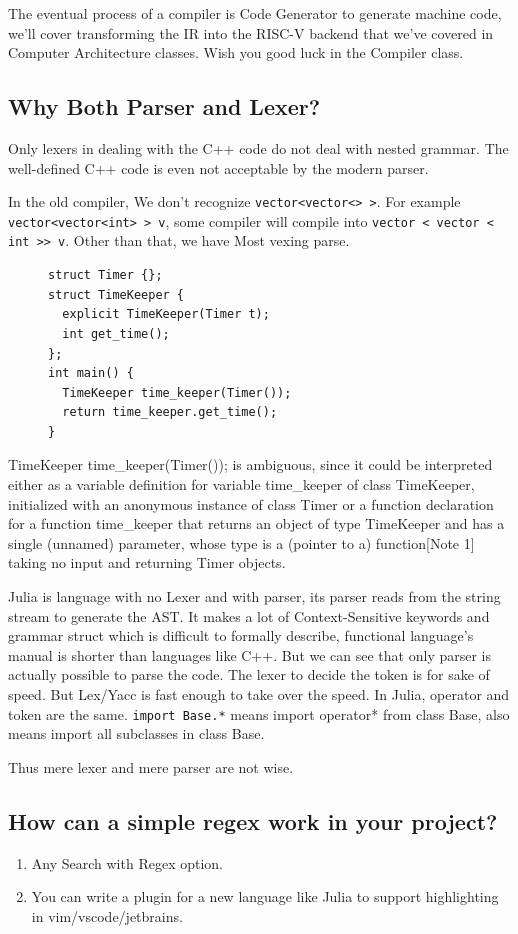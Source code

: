 \documentclass[a4paper]{exam}
\newcommand{\code}[1]{\texttt{#1}}
\begin{document}
The eventual process of a compiler is Code Generator to generate machine code, we'll cover transforming the IR into the RISC-V backend that we've covered in Computer Architecture classes. Wish you good luck in the Compiler class.

\subsection{Why Both Parser and Lexer?}
Only lexers in dealing with the C++ code do not deal with nested grammar. The well-defined C++ code is even not acceptable by the modern parser.

In the old compiler, We don't recognize \code{vector<vector<> >}. For example \code{vector<vector<int> > v}, some compiler will compile into \code{vector < vector < int >> v}. Other than that, we have Most vexing parse.

\begin{figure}[H]
  \begin{verbatim}
struct Timer {};
struct TimeKeeper {
  explicit TimeKeeper(Timer t);
  int get_time();
};
int main() {
  TimeKeeper time_keeper(Timer());
  return time_keeper.get_time();
}
    \end{verbatim}
\end{figure}

TimeKeeper time\_keeper(Timer()); is ambiguous, since it could be interpreted either as a variable definition for variable time\_keeper of class TimeKeeper, initialized with an anonymous instance of class Timer or a function declaration for a function time\_keeper that returns an object of type TimeKeeper and has a single (unnamed) parameter, whose type is a (pointer to a) function[Note 1] taking no input and returning Timer objects. \cite{mvp}

Julia is language with no Lexer and with parser, its parser reads from the string stream to generate the AST. It makes a lot of Context-Sensitive keywords and grammar struct which is difficult to formally describe, functional language's manual is shorter than languages like C++. But we can see that only parser is actually possible to parse the code. The lexer to decide the token is for sake of speed. But Lex/Yacc is fast enough to take over the speed. In Julia, operator and token are the same. \code{import Base.*} means import operator* from class Base, also means import all subclasses in class Base.

Thus mere lexer and mere parser are not wise.
\subsection{How can a simple regex work in your project?}
\begin{enumerate}
  \item Any Search with Regex option.
  \item You can write a plugin for a new language like Julia to support highlighting in vim/vscode/jetbrains.
\end{enumerate}
\end{document}
